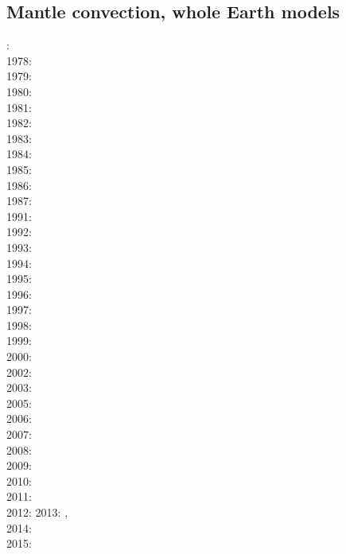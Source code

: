 \cite{leka93}

\subsection*{Mantle convection, whole Earth models}

: \cite{hemw75}\\
1978: \cite{mahz78}\\
1979: \cite{ludt79}\cite{buss79}\\
1980: \cite{olco80}\cite{jamc80}\\
1981: \cite{buss81}\\
1982: \cite{jape82}\cite{homc82}\\
1983: \cite{hous83}\cite{hous83b}\cite{chri83}\\
1984: \cite{olyb84}\cite{jarv84}\cite{haeb84}\cite{harp84}\cite{davi84}\cite{boas84}\cite{chri84}\\
1985: \cite{jarv85}\cite{baum85}\cite{chri85}\cite{csra85}\\
1986: \cite{davi86}\\
1987: \cite{yuqh87}\\
1991: \cite{chha91}\\
1992: \cite{besg92}\\
1993: \cite{zhch93}\cite{jarv93}\cite{tack93}\cite{bucc93}\cite{carm93}\\
1994: \cite{haeb94}\cite{chho94}\\
1995: \cite{zhgu95}\\
1996: \cite{zhyu96}\cite{hond96}\cite{rytr96a}\cite{rytr96b}\cite{tack96}\cite{trbo96}
\cite{birg96}\cite{burb96}\cite{kafo96}\\
1997: \cite{hond97}\cite{iwho97}\cite{burb97}\\
1998: \cite{ande98}\cite{iwho98}\cite{devv98}\cite{tack98}\cite{tack98b}\cite{trha98b}
\cite{trha98}\cite{burl98}\\
1999: \cite{duyr99}\\
2000: \cite{albe00}\cite{hayu00}\cite{devv00b}\cite{tack00b}\cite{zhzm00}\\
2002: \cite{tasu02}\\
2003: \cite{hapa03}\\
2005: \cite{taxn05}\cite{bupc05}\\
2006: \cite{beck06}\\
2007: \cite{nake07}\\
2008: \cite{tack08}\cite{chhl08}\\
2009: \cite{wodd09}\\
2010: \cite{bumb10}\\
2011: \cite{lowm11}\cite{rota11}\cite{woda11}\\
2012: \cite{bisa12}
2013: \cite{holj13}\cite{dadb13}\cite{toyd13},\cite{bogs13a}\cite{busa13}\\
2014: \cite{arfw14}\cite{helo14}\cite{crta14}\\
2015: \cite{thkp15}

